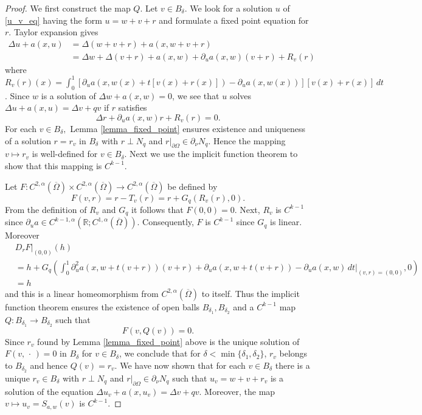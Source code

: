 \documentclass[11pt,a4paper]{amsart}
\theoremstyle{definition}
\numberwithin{equation}{section}
\newcommand{\ol}[1]{\overline{#1}}
\newcommand{\p}{\partial}
\newcommand{\Om}{\Omega}
\begin{document}
\begin{proof}
We first construct the map $Q$. Let $v \in B_{\delta}$. We look for a solution $u$ of \eqref{u_v_eq} having the form $u = w + v + r$ and formulate a fixed point equation for $r$.
Taylor expansion gives 
\begin{align*}
    \Delta u + a(x,u) &= \Delta(w+v+r) + a(x,w+v+r) \\
		&= \Delta w + \Delta(v+r) + a(x,w) + \p_u a(x,w) (v+r) + R_{v}(r)
\end{align*}
where $R_v(r)(x) = \int_0^1 [\p_u a(x,w(x)+t[v(x)+r(x)]) - \p_u a(x,w(x))][v(x)+r(x)] \,dt$.
Since $w$ is a solution of $\Delta w + a(x,w) = 0$, we see that $u$ solves $\Delta u + a(x,u) = \Delta v + qv$ if $r$ satisfies 
\[
    \Delta r + \p_u a(x,w) r + R_v(r) = 0.
\]
For each $v \in B_{\delta},$ Lemma \ref{lemma_fixed_point} ensures existence and uniqueness of a solution $r = r_v$ in \( B_{\delta} \) with $r \perp N_q$ and $r|_{\p \Om} \in \p_{\nu} N_q$.
Hence the mapping $v\mapsto r_v$ is well-defined for $v\in B_{\delta}$.
Next we use the implicit function theorem to show that this mapping is \( C^{k-1} \).

Let \( F: C^{2,\alpha}(\ol{\Omega})\times C^{2,\alpha}(\ol{\Omega})\to C^{2,\alpha}(\ol{\Omega}) \) be defined by 
\begin{equation*}
    F(v,r)=r-T_v(r)=r+G_q(R_v(r),0).
\end{equation*}
From the definition of \( R_{v} \) and \( G_q \) it follows that $F(0,0)=0$.
Next, \( R_{v} \) is \( C^{k-1} \) since \( \partial_{u}a \in C^{k-1,\alpha}(\mathbb{R} ; C^{1,\alpha}(\ol{\Omega}) ) \).
Consequently, \( F \) is \( C^{k-1} \) since \( G_q \) is linear.
Moreover
\begin{align*}
    &D_rF|_{(0,0)}(h)\\
    &=h+G_q\left(\int_0^1 \partial_u^2a(x,w+t(v+r))(v+r)+\partial_ua(x,w+t(v+r))-\partial_ua(x,w)\,dt|_{(v,r)=(0,0)},0\right)\\
    &=h
\end{align*}
and this is a linear homeomorphism from
\( C^{2,\alpha}(\ol{\Omega}) \)
to itself.
Thus the implicit function theorem \cite[Theorem 4]{hg27} ensures the existence of open balls \( B_{\delta_1},B_{\delta_2} \) and a $C^{k-1}$ map $Q \colon B_{\delta_1}\to B_{\delta_{2}}$ such that
\begin{equation*}
    F(v,Q(v))=0.
\end{equation*}
Since \( r_{v} \) found by Lemma \ref{lemma_fixed_point} above is the unique solution of $F(v,\,\cdot\,)=0$ in \( B_{\delta} \) for \( v \in B_{\delta}\), we conclude that for \( \delta < \min\{\delta_{1},\delta_{2}\} \), \( r_{v} \) belongs to \( B_{\delta_{2}} \) and hence \( Q(v) = r_{v} \).
We have now shown that for each \( v\in B_{\delta} \) there is a unique \( r_{v}\in B_{\delta} \) with $r \perp N_q$ and $r|_{\p \Om} \in \p_{\nu} N_q$ such that \( u_{v} = w+v+r_{v} \) is a solution of the equation $\Delta u_{v} + a(x,u_{v}) = \Delta v + qv$.
Moreover, the map \( v\mapsto u_{v} = S_{a,w}(v) \) is \( C^{k-1} \).


\end{proof}
\end{document}
